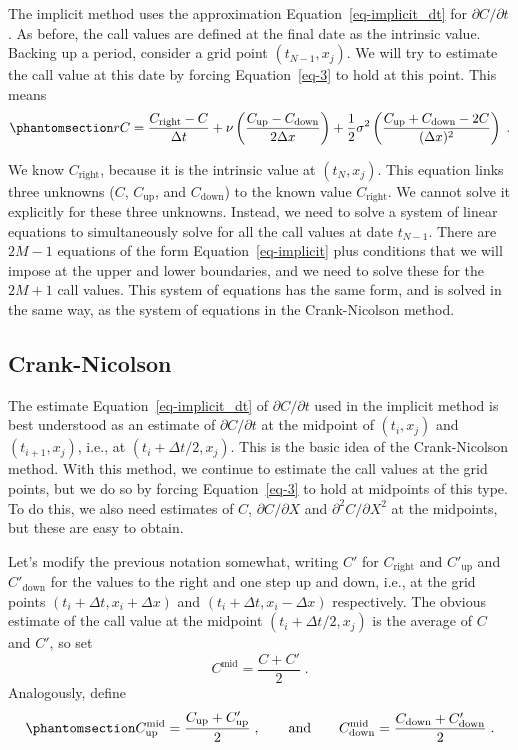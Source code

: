 \documentclass[
  letterpaper,
  DIV=11,
  numbers=noendperiod]{scrartcl}
\theoremstyle{definition}
\theoremstyle{remark}
\begin{document}
The implicit method  uses the approximation
Equation~\ref{eq-implicit_dt} for \(\partial C/\partial t\). As before,
the call values are defined at the final date as the intrinsic value.
Backing up a period, consider a grid point \((t_{N-1},x_j)\). We will
try to estimate the call value at this date by forcing
Equation~\ref{eq-3} to hold at this point. This means
\begin{equation}\phantomsection\label{eq-implicit}{
rC = \frac{C_{\text{right}}-C}{\Delta t}+ \nu\left(\frac{C_{\text{up}}-C_{\text{down}}}{2\Delta x}\right)+ \frac{1}{2}\sigma^2\left(\frac{C_{\text{up}}+C_{\text{down}}-2C}{(\Delta x)^2}\right)\;.
}\end{equation}

We know \(C_{\text{right}}\), because it is the intrinsic value at
\((t_N,x_j)\). This equation links three unknowns (\(C\),
\(C_{\text{up}}\), and \(C_{\text{down}}\)) to the known value
\(C_{\text{right}}\). We cannot solve it explicitly for these three
unknowns. Instead, we need to solve a system of linear equations to
simultaneously solve for all the call values at date \(t_{N-1}\). There
are \(2M-1\) equations of the form Equation~\ref{eq-implicit} plus
conditions that we will impose at the upper and lower boundaries, and we
need to solve these for the \(2M+1\) call values. This system of
equations has the same form, and is solved in the same way, as the
system of equations in the Crank-Nicolson method.

\subsection{Crank-Nicolson}\label{crank-nicolson}

 The estimate Equation~\ref{eq-implicit_dt}
of \(\partial C/\partial t\) used in the implicit method is best
understood as an estimate of \(\partial C/\partial t\) at the midpoint
of \((t_i,x_j)\) and \((t_{i+1},x_j)\), i.e., at
\((t_i+\Delta t/2,x_j)\). This is the basic idea of the Crank-Nicolson
method. With this method, we continue to estimate the call values at the
grid points, but we do so by forcing Equation~\ref{eq-3} to hold at
midpoints of this type. To do this, we also need estimates of \(C\),
\(\partial C/\partial X\) and \(\partial^2 C/\partial X^2\) at the
midpoints, but these are easy to obtain.

Let's modify the previous notation somewhat, writing \(C'\) for
\(C_{\text{right}}\) and \(C'_{\text{up}}\) and \(C'_{\text{down}}\) for
the values to the right and one step up and down, i.e., at the grid
points \((t_i+\Delta t,x_i+\Delta x)\) and
\((t_i+\Delta t,x_i-\Delta x)\) respectively. The obvious estimate of
the call value at the midpoint \((t_i+\Delta t/2,x_j)\) is the average
of \(C\) and \(C'\), so set \[
C^{\text{mid}} = \frac{C+C'}{2}\;.
\] Analogously, define \begin{equation}\phantomsection\label{eq-cn1000}{
C^{\text{mid}}_{\text{up}} = \frac{C_{\text{up}}+C'_{\text{up}}}{2}\;, \qquad \text{and} \qquad
C^{\text{mid}}_{\text{down}} = \frac{C_{\text{down}}+C'_{\text{down}}}{2}\;.
}\end{equation}
\end{document}
